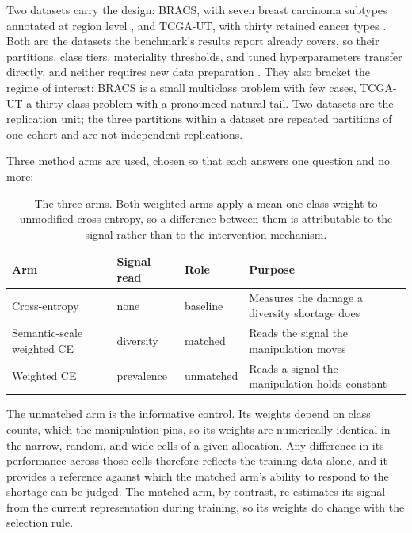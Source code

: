 \documentclass[11pt]{article}
\begin{document}
\noindent Two datasets carry the design: BRACS, with seven breast carcinoma subtypes annotated at region level \citep{brancati2022bracs}, and TCGA-UT, with thirty retained cancer types \citep{komura2022universalEncoding}. Both are the datasets the benchmark's results report already covers, so their partitions, class tiers, materiality thresholds, and tuned hyperparameters transfer directly, and neither requires new data preparation \citep{queisler2026datasets}. They also bracket the regime of interest: BRACS is a small multiclass problem with few cases, TCGA-UT a thirty-class problem with a pronounced natural tail. Two datasets are the replication unit; the three partitions within a dataset are repeated partitions of one cohort and are not independent replications.

Three method arms are used, chosen so that each answers one question and no more:

\begin{table}[H]
  \centering
  \small
  \begin{tabularx}{\linewidth}{@{}lll>{\raggedright\arraybackslash}X@{}}
    \toprule
    Arm & Signal read & Role & Purpose \\
    \midrule
    Cross-entropy & none & baseline & Measures the damage a diversity shortage does \\
    Semantic-scale weighted CE & diversity & matched & Reads the signal the manipulation moves \\
    Weighted CE & prevalence & unmatched & Reads a signal the manipulation holds constant \\
    \bottomrule
  \end{tabularx}
  \caption{The three arms. Both weighted arms apply a mean-one class weight to unmodified cross-entropy, so a difference between them is attributable to the signal rather than to the intervention mechanism.}
  \label{tab:arms}
\end{table}

\noindent The unmatched arm is the informative control. Its weights depend on class counts, which the manipulation pins, so its weights are numerically identical in the narrow, random, and wide cells of a given allocation. Any difference in its performance across those cells therefore reflects the training data alone, and it provides a reference against which the matched arm's ability to respond to the shortage can be judged. The matched arm, by contrast, re-estimates its signal from the current representation during training, so its weights do change with the selection rule.
\end{document}
